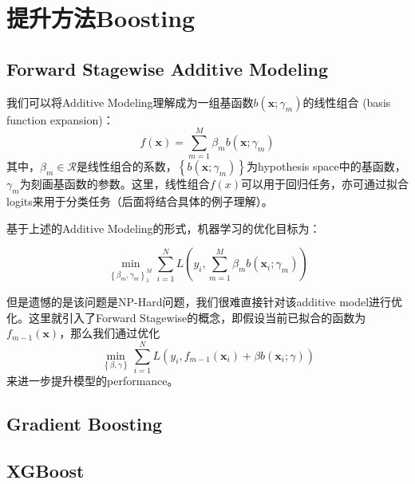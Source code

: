 \chapter{提升方法Boosting}

\section{Forward Stagewise Additive Modeling}

我们可以将Additive Modeling理解成为一组基函数${b(\bm{x};\gamma_m)}$的线性组合 (basis function expansion)：
\begin{equation}
    f(\bm{x})=\sum_{m=1}^{M}{\beta_m b(\bm{x};\gamma_m)}
\end{equation}
其中，$\beta_m \in \mathcal{R}$是线性组合的系数，$\left\{b(\bm{x};\gamma_m)\right\}$为hypothesis space中的基函数，$\gamma_m$为刻画基函数的参数。这里，线性组合$f(x)$可以用于回归任务，亦可通过拟合logits来用于分类任务（后面将结合具体的例子理解）。

基于上述的Additive Modeling的形式，机器学习的优化目标为：

\begin{equation}
    \min_{\left\{\beta_m, \gamma_m\right\}_1^M} \sum_{i=1}^{N}{L\left(y_i, \sum_{m=1}^{M}{\beta_m b(\bm{x}_i; \gamma_m)}\right)}
\end{equation}

但是遗憾的是该问题是NP-Hard问题，我们很难直接针对该additive model进行优化。这里就引入了Forward Stagewise的概念，即假设当前已拟合的函数为$f_{m-1}(\bm{x})$，那么我们通过优化
\begin{equation}
    \min_{\left\{\beta, \gamma\right\}} \sum_{i=1}^{N}{L\left(y_i, f_{m-1}(\bm{x}_i) + \beta b(\bm{x}_i; \gamma)\right)}
\end{equation}
来进一步提升模型的performance。


\section{Gradient Boosting}

\section{XGBoost}
